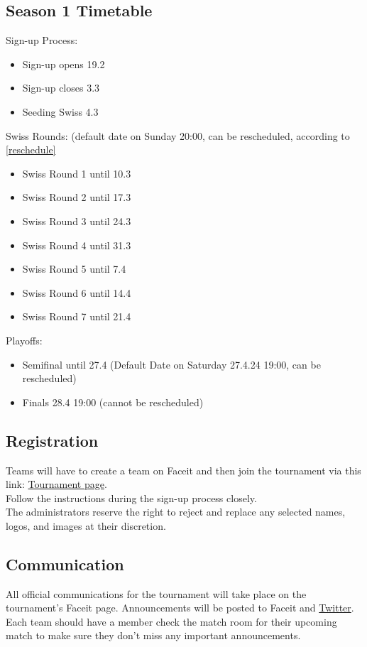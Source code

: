 \documentclass{article}
\def\twitter{\href{https://twitter.com/chcsleague}{Twitter}}
\begin{document}
\subsection{Season 1 Timetable}\label{timetable}
Sign-up Process:
\begin{itemize}
\item Sign-up opens 19.2
\item Sign-up closes 3.3
\item Seeding Swiss 4.3
\end{itemize}
Swiss Rounds: (default date on Sunday 20:00, can be rescheduled, according to \ref{reschedule}
\begin{itemize}
\item Swiss Round 1 until 10.3
\item Swiss Round 2 until 17.3
\item Swiss Round 3 until 24.3
\item Swiss Round 4 until 31.3
\item Swiss Round 5 until 7.4
\item Swiss Round 6 until 14.4
\item Swiss Round 7 until 21.4
\end{itemize}
Playoffs:
\begin{itemize}
\item Semifinal until 27.4 (Default Date on Saturday 27.4.24 19:00, can be rescheduled)
\item Finals 28.4 19:00 (cannot be rescheduled)
\end{itemize}

\subsection{Registration}\label{register}
Teams will have to create a team on Faceit and then join the tournament via this link: \href{www.google.com}{Tournament page}.\\
Follow the instructions during the sign-up process closely.\\
The administrators reserve the right to reject and replace any selected names, logos, and images at their discretion. 

\subsection{Communication}\label{communication}
All official communications for the tournament will take place on the tournament's Faceit page. Announcements will be posted to Faceit and \twitter. Each team should have a member check the match room for their upcoming match to make sure they don't miss any important announcements. 
\end{document}
